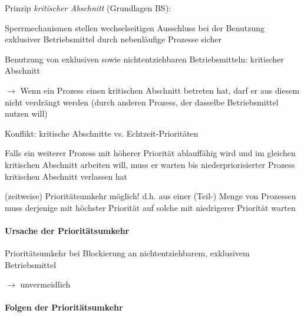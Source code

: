 \documentclass[a4paper]{article}
\begin{document}
\begin{multicols}{3}
    \begin{itemize*}
        \item Prinzip \emph{kritischer Abschnitt} (Grundlagen BS):
        \begin{itemize*}
            \item Sperrmechanismen stellen wechselseitigen Ausschluss bei der Benutzung exklusiver Betriebsmittel durch nebenläufige Prozesse sicher
            \item Benutzung von exklusiven sowie nichtentziehbaren Betriebsmitteln: kritischer Abschnitt
            \item[$\rightarrow$] Wenn ein Prozess einen kritischen Abschnitt betreten hat, darf er aus diesem nicht verdrängt werden (durch anderen Prozess, der dasselbe Betriebsmittel nutzen will)
        \end{itemize*}
        \item Konflikt: kritische Abschnitte vs. Echtzeit-Prioritäten
        \begin{itemize*}
            \item Falls ein weiterer Prozess mit höherer Priorität ablauffähig wird und im gleichen kritischen Abschnitt arbeiten will, muss er warten bis niederpriorisierter Prozess kritischen Abschnitt verlassen hat
            \item (zeitweise) Prioritätsumkehr möglich! d.h. aus einer (Teil-) Menge von Prozessen muss derjenige mit höchster Priorität auf solche mit niedrigerer Priorität warten
        \end{itemize*}
    \end{itemize*}


    \paragraph{Ursache der
        Prioritätsumkehr}

    \begin{itemize*}
        \item Prioritätsumkehr bei Blockierung an nichtentziehbarem, exklusivem
        Betriebsmittel
        \item $\rightarrow$ unvermeidlich
    \end{itemize*}


    \paragraph{Folgen der
        Prioritätsumkehr}


\end{multicols}
\end{document}
